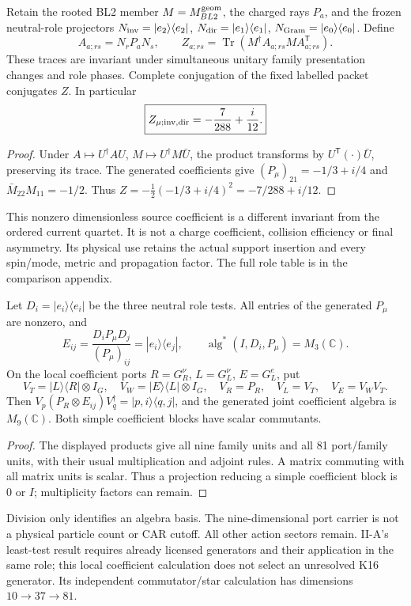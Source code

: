 \documentclass[12pt,a4paper]{article}
\begin{document}
\begin{theorem}
\label{p5c:thm:v2167-mixed-family-coefficient}
Retain the rooted BL2 member $M=M_{BL2}^{\rm geom}$, the charged rays $P_a$,
and the frozen neutral-role projectors
$N_{\rm inv}=|e_2\rangle\langle e_2|$,
$N_{\rm dir}=|e_1\rangle\langle e_1|$,
$N_{\rm Gram}=|e_0\rangle\langle e_0|$. Define
\[
 A_{a;rs}=N_rP_aN_s,\qquad
 Z_{a;rs}=\operatorname{Tr}(M^\dagger A_{a;rs}M A_{a;rs}^{\mathsf T}).
\]
These traces are invariant under simultaneous unitary family
presentation changes and role phases. Complete conjugation of the fixed
labelled packet conjugates $Z$. In particular
\[
 \boxed{Z_{\mu;\rm inv,dir}=-\frac7{288}+\frac i{12}.}
\]
\end{theorem}
\begin{proof}
Under $A\mapsto U^\dagger AU$, $M\mapsto U^\dagger M\bar U$, the
product transforms by $U^{\mathsf T}(\cdot)\bar U$, preserving its trace.
The generated coefficients give
$(P_\mu)_{21}=-1/3+i/4$ and $\bar M_{22}M_{11}=-1/2$.
Thus $Z=-\frac12(-1/3+i/4)^2=-7/288+i/12$.
\end{proof}
This nonzero dimensionless source coefficient is a different invariant
from the ordered current quartet. It is not a charge coefficient,
collision efficiency or final asymmetry. Its physical use retains the
actual support insertion and every spin/mode, metric and propagation
factor. The full role table is in the comparison appendix.

\begin{proposition}
\label{p5c:prop:v2167-generated-coefficient-algebras}
Let $D_i=|e_i\rangle\langle e_i|$ be the three neutral role tests.
All entries of the generated $P_\mu$ are nonzero, and
\[
 E_{ij}=\frac{D_iP_\mu D_j}{(P_\mu)_{ij}}=|e_i\rangle\langle e_j|,
 \qquad \operatorname{alg}^*(I,D_i,P_\mu)=M_3(\mathbb C).
\]
On the local coefficient ports
$R=G_R^\nu$, $L=G_L^\nu$, $E=G_L^e$, put
\[
 V_T=|L\rangle\langle R|\otimes I_G,\quad
 V_W=|E\rangle\langle L|\otimes I_G,\quad
 V_R=P_R,\quad V_L=V_T,\quad V_E=V_WV_T.
\]
Then $V_p(P_R\otimes E_{ij})V_q^\dagger=|p,i\rangle\langle q,j|$,
and the generated joint coefficient algebra is $M_9(\mathbb C)$.
Both simple coefficient blocks have scalar commutants.
\end{proposition}
\begin{proof}
The displayed products give all nine family units and all 81 port/family
units, with their usual multiplication and adjoint rules. A matrix
commuting with all matrix units is scalar. Thus a projection reducing a
simple coefficient block is $0$ or $I$; multiplicity factors can remain.
\end{proof}
Division only identifies an algebra basis. The nine-dimensional port
carrier is not a physical particle count or CAR cutoff. All other action
sectors remain. II-A's least-test result requires already licensed
generators and their application in the same role; this local coefficient
calculation does not select an unresolved K16 generator. Its independent
commutator/star calculation has dimensions $10\to37\to81$.
\end{document}
